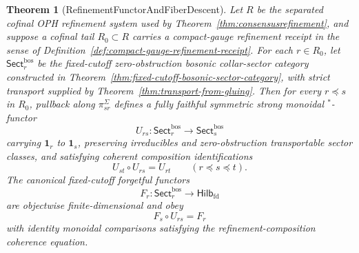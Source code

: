 \documentclass[11pt]{article}
\newtheorem{theorem}{Theorem}[section]
\begin{document}
\begin{theorem}[RefinementFunctorAndFiberDescent]\label{thm:refinement-functor-fiber-descent}
Let \(R\) be the separated cofinal OPH refinement system used by
Theorem~\ref{thm:consensusrefinement}, and suppose a cofinal tail \(R_0\subset R\) carries a
compact-gauge refinement receipt in the sense of
Definition~\ref{def:compact-gauge-refinement-receipt}. For each \(r\in R_0\), let
\(\mathsf{Sect}^{\mathrm{bos}}_r\) be the fixed-cutoff zero-obstruction bosonic collar-sector
category constructed in Theorem~\ref{thm:fixed-cutoff-bosonic-sector-category}, with strict
transport supplied by Theorem~\ref{thm:transport-from-gluing}. Then for every
\(r\preceq s\) in \(R_0\), pullback along \(\pi_{sr}^{\Sigma}\) defines a fully faithful symmetric
strong monoidal \(^*\)-functor
\[
U_{rs}:\mathsf{Sect}^{\mathrm{bos}}_r\longrightarrow \mathsf{Sect}^{\mathrm{bos}}_s
\]
carrying \(\mathbf 1_r\) to \(\mathbf 1_s\), preserving irreducibles and zero-obstruction
transportable sector classes, and satisfying coherent composition identifications
\[
U_{st}\circ U_{rs}=U_{rt}
\qquad (r\preceq s\preceq t).
\]
The canonical fixed-cutoff forgetful functors
\[
F_r:\mathsf{Sect}^{\mathrm{bos}}_r\longrightarrow \mathsf{Hilb}_{\mathrm{fd}}
\]
are objectwise finite-dimensional and obey
\[
F_s\circ U_{rs}=F_r
\]
with identity monoidal comparisons satisfying the refinement-composition coherence equation.
\end{theorem}
\end{document}
